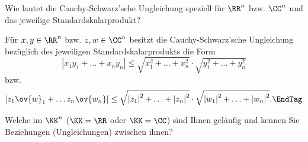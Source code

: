 \begin{frage}
  Wie lautet die Cauchy-Schwarz'sche Ungleichung speziell für 
  $\RR^n$ bzw. $\CC^n$ und das jeweilige Standardskalarprodukt?
\end{frage}

\begin{antwort}
  Für $x,y\in \RR^n$ bzw. $z,w\in\CC^n$ besitzt die Cauchy-Schwarz'sche 
  Ungleichung bezüglich des jeweiligen Standardskalarprodukts die Form
  \[
  |x_1y_1+\ldots + x_ny_n|  \le  
  \sqrt{ x_1^2 + \ldots + x_n^2 } \cdot 
  \sqrt{ y_1^2+ \ldots + y_n^2 } 
  \]
  bzw.
  \begin{equation}
    |z_1 \ov{w}_1 + \ldots z_n \ov{w_n}|  \le  
    \sqrt{ \left|z_1\right|^2 + \ldots + \left|z_n\right|^2 } \cdot 
    \sqrt{ \left|w_1\right|^2 + \ldots + \left|w_n\right|^2 }. \EndTag
  \end{equation}
\end{antwort}






\begin{frage}\label{01_pnorm}
  Welche  im 
  $\KK^n$ ($\KK=\RR$ oder $\KK=\CC$) sind Ihnen geläufig und kennen 
  Sie Beziehungen (Ungleichungen) zwischen ihnen?
\end{frage}

